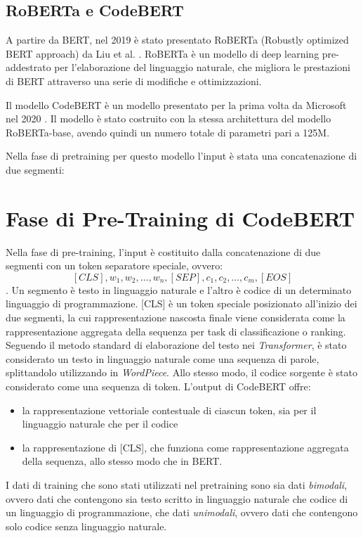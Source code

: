 \documentclass[../../Thesis.tex]{subfiles}
\begin{document}
\subsection{RoBERTa e CodeBERT}
A partire da BERT, nel 2019 è stato presentato RoBERTa (Robustly optimized BERT approach) da Liu et al. \cite{RoBERTa}. RoBERTa è un modello di deep learning pre-addestrato per l'elaborazione del linguaggio naturale, che migliora le prestazioni di BERT attraverso una serie di modifiche e ottimizzazioni. 


Il modello CodeBERT è un modello presentato per la prima volta da Microsoft nel 2020 \cite{CodeBERT}. Il modello è stato costruito con la stessa architettura del modello RoBERTa-base, avendo quindi un numero totale di parametri pari a 125M. 

Nella fase di pretraining per questo modello l'input è stata una concatenazione di due segmenti: 

\section{Fase di Pre-Training di CodeBERT}

Nella fase di pre-training, l'input è costituito dalla concatenazione di due segmenti con un token separatore speciale, ovvero: $$[CLS], w_1, w_2, \ldots, w_n, [SEP], c_1, c_2, \ldots, c_m, [EOS]$$. Un segmento è testo in linguaggio naturale e l'altro è codice di un determinato linguaggio di programmazione. [CLS] è un token speciale posizionato all'inizio dei due segmenti, la cui rappresentazione nascosta finale viene considerata come la rappresentazione aggregata della sequenza per task di classificazione o ranking. Seguendo il metodo standard di elaborazione del testo nei \textit{Transformer}, è stato considerato un testo in linguaggio naturale come una sequenza di parole, splittandolo utilizzando in \textit{WordPiece}. Allo stesso modo, il codice sorgente è stato considerato come una sequenza di token.
L'output di CodeBERT offre: 
\begin{itemize}
    \item la rappresentazione vettoriale contestuale di ciascun token, sia per il linguaggio naturale che per il codice
    \item la rappresentazione di [CLS], che funziona come rappresentazione aggregata della sequenza, allo stesso modo che in BERT.
\end{itemize}
I dati di training che sono stati utilizzati nel pretraining sono sia dati \emph{bimodali}, ovvero dati che contengono sia testo scritto in linguaggio naturale che codice di un linguaggio di programmazione, che dati \emph{unimodali}, ovvero dati che contengono solo codice senza linguaggio naturale. 
\end{document}
